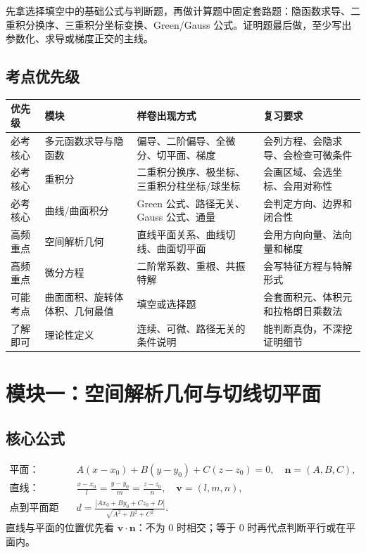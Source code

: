 \documentclass[UTF8,zihao=-4]{ctexart}
\newcommand{\ve}[1]{\bm{#1}}
\begin{document}
\begin{keybox}[拿分顺序]
先拿选择填空中的基础公式与判断题，再做计算题中固定套路题：隐函数求导、二重积分换序、三重积分坐标变换、Green/Gauss 公式。证明题最后做，至少写出参数化、求导或梯度正交的主线。
\end{keybox}

\subsection{考点优先级}

\begin{longtable}{p{}p{}p{}p{}}
\toprule
\textbf{优先级} & \textbf{模块} & \textbf{样卷出现方式} & \textbf{复习要求} \\
\midrule
必考核心 & 多元函数求导与隐函数 & 偏导、二阶偏导、全微分、切平面、梯度 & 会列方程、会隐求导、会检查可微条件 \\
必考核心 & 重积分 & 二重积分换序、极坐标、三重积分柱坐标/球坐标 & 会画区域、会选坐标、会用对称性 \\
必考核心 & 曲线/曲面积分 & Green 公式、路径无关、Gauss 公式、通量 & 会判定方向、边界和闭合性 \\
高频重点 & 空间解析几何 & 直线平面关系、曲线切线、曲面切平面 & 会用方向向量、法向量和梯度 \\
高频重点 & 微分方程 & 二阶常系数、重根、共振特解 & 会写特征方程与特解形式 \\
可能考点 & 曲面面积、旋转体体积、几何最值 & 填空或选择题 & 会套面积元、体积元和拉格朗日乘数法 \\
了解即可 & 理论性定义 & 连续、可微、路径无关的条件说明 & 能判断真伪，不深挖证明细节 \\
\bottomrule
\end{longtable}

\section{模块一：空间解析几何与切线切平面}

\subsection{核心公式}
\begin{keybox}[向量、直线、平面]
\begin{align*}
\text{平面：}\quad & A(x-x_0)+B(y-y_0)+C(z-z_0)=0,\quad \ve n=(A,B,C),\\
\text{直线：}\quad & \frac{x-x_0}{l}=\frac{y-y_0}{m}=\frac{z-z_0}{n},\quad \ve v=(l,m,n),\\
\text{点到平面距离：}\quad & d=\frac{|Ax_0+By_0+Cz_0+D|}{\sqrt{A^2+B^2+C^2}}.
\end{align*}
直线与平面的位置优先看 $\ve v\cdot\ve n$：不为 0 时相交；等于 0 时再代点判断平行或在平面内。
\end{keybox}
\end{document}
